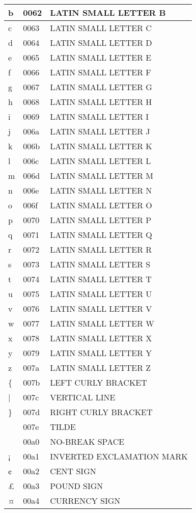 \documentclass[12pt,letterpaper,openany]{book}
\begin{document}
\begin{center}
\begin{supertabular}{|m{0.25in}|m{0.5in}|m{4in}|}
b & 0062 & LATIN SMALL LETTER B\\\hline
c & 0063 & LATIN SMALL LETTER C\\\hline
d & 0064 & LATIN SMALL LETTER D\\\hline
e & 0065 & LATIN SMALL LETTER E\\\hline
f & 0066 & LATIN SMALL LETTER F\\\hline
g & 0067 & LATIN SMALL LETTER G\\\hline
h & 0068 & LATIN SMALL LETTER H\\\hline
i & 0069 & LATIN SMALL LETTER I\\\hline
j & 006a & LATIN SMALL LETTER J\\\hline
k & 006b & LATIN SMALL LETTER K\\\hline
l & 006c & LATIN SMALL LETTER L\\\hline
m & 006d & LATIN SMALL LETTER M\\\hline
n & 006e & LATIN SMALL LETTER N\\\hline
o & 006f & LATIN SMALL LETTER O\\\hline
p & 0070 & LATIN SMALL LETTER P\\\hline
q & 0071 & LATIN SMALL LETTER Q\\\hline
r & 0072 & LATIN SMALL LETTER R\\\hline
s & 0073 & LATIN SMALL LETTER S\\\hline
t & 0074 & LATIN SMALL LETTER T\\\hline
u & 0075 & LATIN SMALL LETTER U\\\hline
v & 0076 & LATIN SMALL LETTER V\\\hline
w & 0077 & LATIN SMALL LETTER W\\\hline
x & 0078 & LATIN SMALL LETTER X\\\hline
y & 0079 & LATIN SMALL LETTER Y\\\hline
z & 007a & LATIN SMALL LETTER Z\\\hline
\{ & 007b & LEFT CURLY BRACKET\\\hline
| & 007c & VERTICAL LINE\\\hline
\} & 007d & RIGHT CURLY BRACKET\\\hline
~ & 007e & TILDE\\\hline
  & 00a0 & NO-BREAK SPACE\\\hline
¡ & 00a1 & INVERTED EXCLAMATION MARK\\\hline
¢ & 00a2 & CENT SIGN\\\hline
£ & 00a3 & POUND SIGN\\\hline
¤ & 00a4 & CURRENCY SIGN\\\hline

\end{supertabular}
\end{center}
\end{document}
